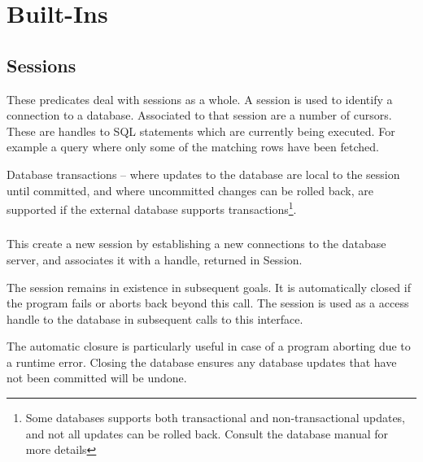 \section{Built-Ins}

\subsection{Sessions}

These predicates deal with sessions as a whole. A session is 
used to identify a connection to a database. Associated to that
session are a number of cursors. These are handles to SQL statements
which are currently being executed. For example a query where only
some of the matching rows have been fetched.


Database transactions -- where updates to the database are local to the
session until committed, and where uncommitted changes can be rolled back, 
are supported if the external database supports transactions\footnote{Some
databases supports both transactional and non-transactional updates,
and not all updates can be rolled back. Consult the database manual for
more details}. 

\subsubsection{}
\label{session-start/3}

This create a new session by establishing a new connections to the
database server, and associates it with a handle,
returned in Session.

The session remains in existence in subsequent goals. It is automatically
closed if the program fails or aborts back beyond this call. The session
is used as a access handle to the database in subsequent calls to this
interface.

The automatic closure is particularly useful in case of a
program aborting due to a runtime error. Closing the database ensures
any database updates that have not been committed will be undone.


